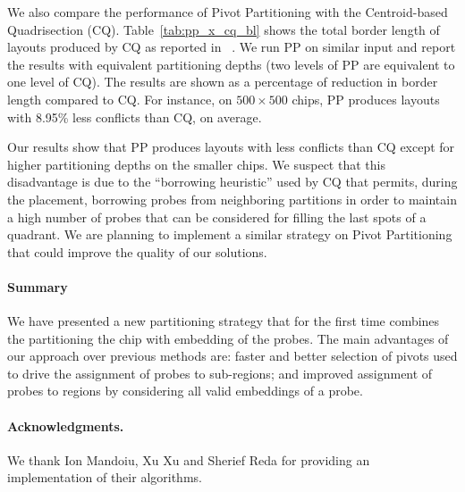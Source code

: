 \documentclass{llncs}
\newcommand{\ignore}[1]{}
\begin{document}
\ignore{
Tables~\ref{tab:pp_affy_bl} and~\ref{tab:pp_affy_ci} shows the results of running PP on chips
containing probe sets of existing Affymetrix GeneChip arrays -- E.Coli 2.0 Genome (EC2), Porcine
Genome (POR) and Wheat Genome (WHT) -- whose probes are synchronously embedded in a deposition
sequence of length 74. Table~\ref{tab:pp_affy_bl} shows the normalized border length
(total border length divided by the number of probes) while Table~\ref{tab:pp_affy_ci} shows
the average conflict index.
} %

We also compare the performance of Pivot Partitioning with the
Centroid-based Quadrisection (CQ). Table~\ref{tab:pp_x_cq_bl} shows the total border
length of layouts produced by CQ as reported in ~\cite{KAHNG03B}. We run PP
on similar input and report the results with equivalent partitioning depths
(two levels of PP are equivalent to one level of CQ). The results are shown
as a percentage of reduction in border length compared to CQ. For instance,
on $500\times 500$ chips, PP produces layouts with 8.95\% less conflicts than
CQ, on average.

Our results
show that PP produces layouts with less conflicts than CQ except for higher
partitioning depths on the smaller chips. We suspect that this disadvantage is
due to the ``borrowing heuristic'' used by CQ that permits, during the placement,
borrowing probes from neighboring partitions in order to maintain a high number
of probes that can be considered for filling the last spots of a quadrant. We are
planning to implement a similar strategy on Pivot Partitioning that could improve
the quality of our solutions.

\paragraph{Summary}
We have presented a new partitioning strategy that for the first time combines
the partitioning the chip with embedding of the probes. The main advantages of
our approach over previous methods are: faster and better selection of pivots
used to drive the assignment of probes to sub-regions; and improved assignment
of probes to regions by considering all valid embeddings of a probe.

\paragraph{Acknowledgments.}We thank Ion Mandoiu, Xu Xu and Sherief Reda for
providing an implementation of their algorithms.
\end{document}

